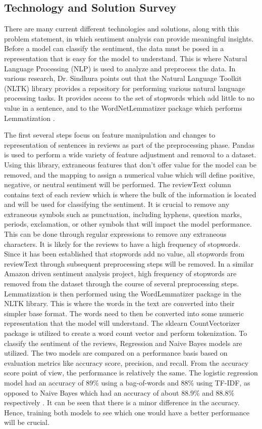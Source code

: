 \documentclass[stu,12pt,floatsintext]{apa7}
\begin{document}
\subsection{Technology and Solution Survey}
There are many current different technologies and solutions, along with this problem statement, in which sentiment analysis can provide meaningful insights. Before a model can classify the sentiment, the data must be posed in a representation that is easy for the model to understand. This is where Natural Language Processing (NLP) is used to analyze and preprocess the data. In various research, Dr. Sindhura points out that the Natural Language Toolkit (NLTK) library provides a repository for performing various natural language processing tasks. It provides access to the set of stopwords which add little to no value in a sentence, and to the WordNetLemmatizer package which performs Lemmatization \parencite{sindhura2023sentiment}.  

The first several steps focus on feature manipulation and changes to representation of sentences in reviews as part of the preprocessing phase. Pandas is used to perform a wide variety of feature adjustment and removal to a dataset. Using this library, extraneous features that don’t offer value for the model can be removed, and the mapping to assign a numerical value which will define positive, negative, or neutral sentiment will be performed. The reviewText column contains text of each review which is where the bulk of the information is located and will be used for classifying the sentiment. It is crucial to remove any extraneous symbols such as punctuation, including hyphens, question marks, periods, exclamation, or other symbols that will impact the model performance. This can be done through regular expressions to remove any extraneous characters. It is likely for the reviews to have a high frequency of stopwords. Since it has been established that stopwords add no value, all stopwords from reviewText through subsequent preprocessing steps will be removed. In a similar Amazon driven sentiment analysis project, high frequency of stopwords are removed from the dataset through the course of several preprocessing steps. Lemmatization is then performed using the WordLemmatizer package in the NLTK library. This is where the words in the text are converted into their simpler base format. The words need to then be converted into some numeric representation that the model will understand. The sklearn CountVectorizer package is utilized to create a word count vector and perform tokenization. To classify the sentiment of the reviews, Regression and Naive Bayes models are utilized. The two models are compared on a performance basis based on evaluation metrics like accuracy score, precision, and recall. From the accuracy score point of view, the performance is relatively the same. The logistic regression model had an accuracy of 89\% using a bag-of-words and 88\% using TF-IDF, as opposed to Naive Bayes which had an accuracy of about 88.9\% and 88.8\% respectively \parencite{jain2020amazon}. It can be seen that there is a minor difference in the accuracy. Hence, training both models to see which one would have a better performance will be crucial.   
\end{document}
